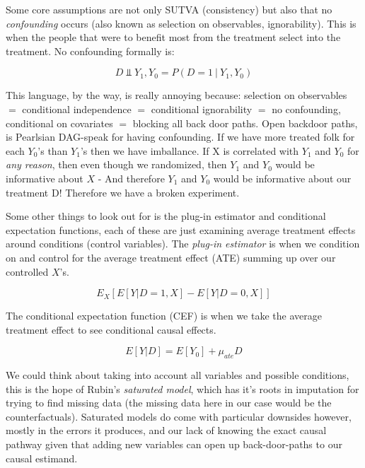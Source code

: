 \documentclass[12pt]{article}\usepackage[]{graphicx}\usepackage[]{color}
\begin{document}
\begin{flushleft}
\noindent Some core assumptions are not only SUTVA (consistency) but also that no \textit{confounding} occurs (also known as selection on observables, ignorability). This is when the people that were to benefit most from the treatment select into the treatment. No confounding formally is:   

\begin{equation}
D \Vbar Y_1, Y_0 = P(D=1 ~ | ~ Y_1, Y_0)
\end{equation}

This language, by the way, is really annoying because: selection on observables $=$ conditional independence $=$ conditional ignorability $=$ no confounding, conditional on covariates $=$ blocking all back door paths.    Open backdoor paths, is Pearlsian DAG-speak for having confounding. If we have more treated folk for each $Y_0$'s than $Y_1$'s then we have imballance. If X is correlated with $Y_1$ and $Y_0$ for \textit{any reason}, then even though we randomized, then $Y_1$ and $Y_0$ would be informative about $X$ - And therefore $Y_1$ and $Y_0$ would be informative about our treatment D! Therefore we have a broken experiment.

Some other things to look out for is the plug-in estimator and conditional expectation functions, each of these are just examining average treatment effects around conditions (control variables). The \textit{plug-in estimator} is when we condition on and control for the average treatment effect (ATE) summing up over our controlled $X$'s.

\begin{equation}
E_X[E[Y |  D = 1, X] − E[Y |D = 0,X]]
\end{equation}

\noindent The conditional expectation function (CEF) is when we take the average treatment effect to see conditional causal effects.

\begin{equation}
E[Y |D] = E[Y_0] + \mu_{ate}D
\end{equation}

We could think about taking into account all variables and possible conditions, this is the hope of Rubin's \textit{saturated model}, which has it's roots in imputation for trying to find missing data (the missing data here in our case would be the counterfactuals). Saturated models do come with particular downsides however, mostly in the errors it produces, and our lack of knowing the exact causal pathway given that adding new variables can open up back-door-paths to our causal estimand.  



\end{flushleft}
\end{document}
